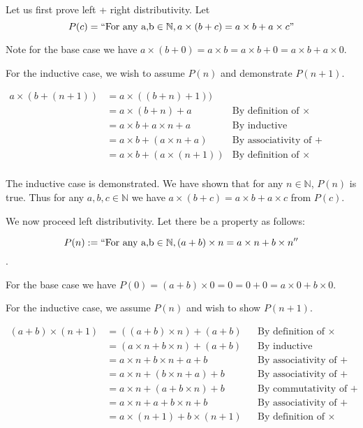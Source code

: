 \documentclass{article}
\begin{document}
\begin{enumerate}
		Let us first prove left + right distributivity. Let $$P(c) = ``\text{For any a,b} \in \mathbb{N}, a \times (b + c) = a \times b + a \times c \text{''}$$
		
		Note for the base case we have $a \times (b + 0) = a \times b = a \times b + 0 = a \times b + a \times 0$.
		
		\medskip
		
		For the inductive case, we wish to assume $P(n)$ and demonstrate $P(n + 1)$. 
		
		\begin{align*}
			a \times (b + (n + 1)) &= a \times ((b + n) + 1))\\
			&= a \times (b + n) + a & \text{By definition of $\times$}\\
			&= a \times b + a \times n + a & \text{By inductive assumption/hypothesis}\\
			&= a \times b + (a \times n + a) & \text{By associativity of $+$}\\
			&= a \times b + (a \times (n + 1)) & \text{By definition of $\times$}\\
		\end{align*}
		
		The inductive case is demonstrated. We have shown that for any $n \in \mathbb{N}$, $P(n)$ is true. Thus for any $a,b,c \in \mathbb{N}$ we have $a \times (b + c) = a \times b + a \times c$ from $P(c)$.
		
		\medskip
		 
		We now proceed left distributivity. Let there be a property as follows:
		
		$$P(n) := ``\text{For any a,b} \in \mathbb{N}, (a + b) \times n = a \times n + b \times n''$$.
		
		For the base case we have $P(0) = (a + b) \times 0 = 0 = 0 + 0 = a \times 0 + b \times 0$.
		
		\medskip
		
		For the inductive case, we assume $P(n)$ and wish to show $P(n + 1)$. 
		
		\begin{align*}
			(a + b) \times (n + 1) &= ((a + b) \times n) + (a + b) && \text{By definition of $\times$}\\
			&= (a \times n + b \times n) + (a + b) && \text{By inductive assumption/hypothesis}\\
			&= a \times n + b \times n + a + b && \text{By associativity of $+$}\\
			&= a \times n + (b \times n + a) + b && \text{By associativity of $+$}\\
			&= a \times n + (a + b \times n) + b && \text{By commutativity of $+$}\\
			&= a \times n + a + b \times n + b && \text{By associativity of $+$}\\
			&= a \times (n + 1) + b \times (n + 1) && \text{By definition of $\times$}\\
		\end{align*}
		

\end{enumerate}
\end{document}
